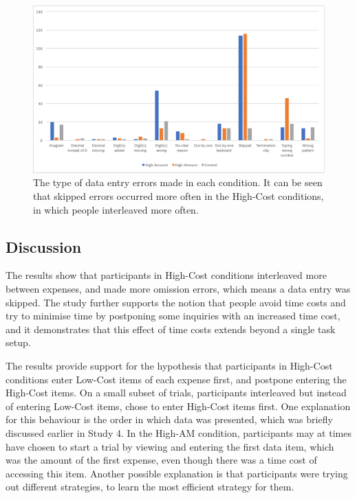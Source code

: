 \begin{figure}
\includegraphics[width=\textwidth]{images/ch34/ch34-5_TypeofErrors.pdf}
    \caption[Study 5 type of data entry errors]{The type of data entry errors made in each condition. It can be seen that skipped errors occurred more often in the High-Cost conditions, in which people interleaved more often.}\label{fig:ch34_5-typeoferrors}
\end{figure}

\subsection{Discussion}
The results show that participants in High-Cost conditions interleaved more between expenses, and made more omission errors, which means a data entry was skipped. The study further supports the notion that people avoid time costs and try to minimise time by postponing some inquiries with an increased time cost, and it demonstrates that this effect of time costs extends beyond a single task setup.

The results provide support for the hypothesis that participants in High-Cost conditions enter Low-Cost items of each expense first, and postpone entering the High-Cost items. On a small subset of trials, participants interleaved but instead of entering Low-Cost items, chose to enter High-Cost items first. One explanation for this behaviour is the order in which data was presented, which was briefly discussed earlier in Study 4. In the High-AM condition, participants may at times have chosen to start a trial by viewing and entering the first data item, which was the amount of the first expense, even though there was a time cost of accessing this item. Another possible explanation is that participants were trying out different strategies, to learn the most efficient strategy for them. 

